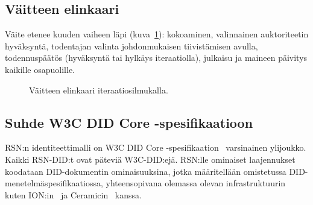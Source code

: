 \documentclass[11pt,a4paper,twocolumn]{article}
\begin{document}
\subsection{Väitteen elinkaari}

Väite etenee kuuden vaiheen läpi (kuva~\ref{fig:lifecycle}): kokoaminen, valinnainen auktoriteetin hyväksyntä, todentajan valinta johdonmukaisen tiivistämisen avulla, todennuspäätös (hyväksyntä tai hylkäys iteraatiolla), julkaisu ja maineen päivitys kaikille osapuolille.

\begin{figure}[ht]
\centering
{}
\caption{Väitteen elinkaari iteraatiosilmukalla.}
\label{fig:lifecycle}
\end{figure}

\subsection{Suhde W3C DID Core -spesifikaatioon}

RSN:n identiteettimalli on W3C DID Core -spesifikaation~\cite{did2022} varsinainen ylijoukko. Kaikki RSN-DID:t ovat päteviä W3C-DID:ejä. RSN:lle ominaiset laajennukset koodataan DID-dokumentin ominaisuuksina, jotka määritellään omistetussa DID-menetelmäspesifikaatiossa, yhteensopivana olemassa olevan infrastruktuurin kuten ION:in~\cite{buchner2021} ja Ceramicin~\cite{ceramic2023} kanssa.
\end{document}
